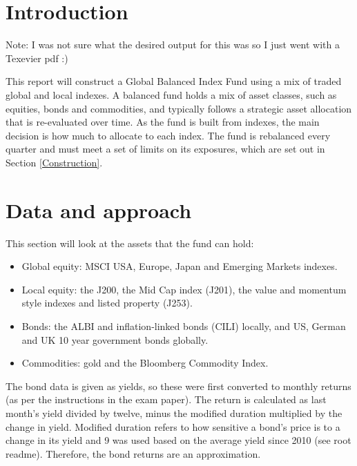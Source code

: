 \documentclass[11pt,preprint]{elsarticle}
\numberwithin{equation}{section}
\numberwithin{figure}{section}
\numberwithin{table}{section}
\def\tightlist{} %
\begin{document}

\headsep 35pt %




\section{\texorpdfstring{Introduction
\label{Introduction}}{Introduction }}\label{introduction}

Note: I was not sure what the desired output for this was so I just went
with a Texevier pdf :)

This report will construct a Global Balanced Index Fund using a mix of
traded global and local indexes. A balanced fund holds a mix of asset
classes, such as equities, bonds and commodities, and typically follows
a strategic asset allocation that is re-evaluated over time. As the fund
is built from indexes, the main decision is how much to allocate to each
index. The fund is rebalanced every quarter and must meet a set of
limits on its exposures, which are set out in Section
\ref{Construction}.

\section{\texorpdfstring{Data and approach
\label{Data}}{Data and approach }}\label{data-and-approach}

This section will look at the assets that the fund can hold:

\begin{itemize}
\tightlist
\item
  Global equity: MSCI USA, Europe, Japan and Emerging Markets indexes.
\item
  Local equity: the J200, the Mid Cap index (J201), the value and
  momentum style indexes and listed property (J253).
\item
  Bonds: the ALBI and inflation-linked bonds (CILI) locally, and US,
  German and UK 10 year government bonds globally.
\item
  Commodities: gold and the Bloomberg Commodity Index.
\end{itemize}

The bond data is given as yields, so these were first converted to
monthly returns (as per the instructions in the exam paper). The return
is calculated as last month's yield divided by twelve, minus the
modified duration multiplied by the change in yield. Modified duration
refers to how sensitive a bond's price is to a change in its yield and 9
was used based on the average yield since 2010 (see root readme).
Therefore, the bond returns are an approximation.
\end{document}
